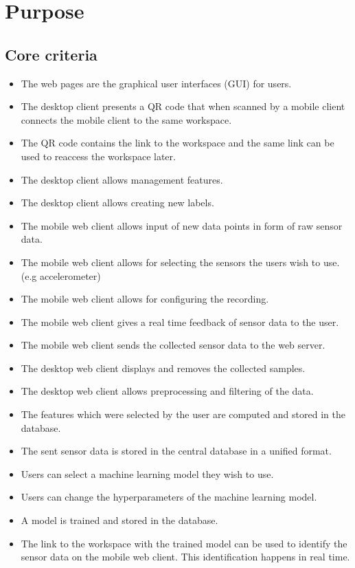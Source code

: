 \section{Purpose}

\subsection{Core criteria}
\begin{itemize}
    \item The web pages are the graphical user interfaces (GUI) for users.
    \item The desktop client presents a QR code that when scanned by a mobile client connects the mobile client to the same \gls{workspace}.
    \item The QR code contains the link to the \gls{workspace} and the same link can be used to reaccess the workspace later.
    \item The desktop client allows management features. %
    \item The desktop client allows creating new labels.
    \item The mobile web client allows input of new data points in form of raw sensor data.
    \item The mobile web client allows for selecting the sensors the users wish to use. (e.g accelerometer)
    \item The mobile web client allows for configuring the recording. %
    \item The mobile web client gives a real time feedback of sensor data to the user.
    \item The mobile web client sends the collected sensor data to the web server. %
    \item The desktop web client displays and removes the collected samples. %
    \item The desktop web client allows preprocessing and filtering of the data.
    \item The features which were selected by the user are computed and stored in the database.
    \item The sent sensor data is stored in the central database in a unified format.
    \item Users can select a machine learning model they wish to use.
    \item Users can change the hyperparameters of the machine learning model.
    \item A model is trained and stored in the database.
    \item The link to the workspace with the trained model can be used to identify the sensor data on the mobile web client. This identification happens in real time.
\end{itemize}

